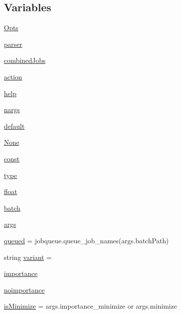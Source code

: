 \subsection*{Variables}
\begin{DoxyCompactItemize}
\item 
\mbox{\hyperlink{namespacerunbatch_a4f18cd32c846ab0a5e16c8faa1870f4d}{Opts}}
\item 
\mbox{\hyperlink{namespacerunbatch_a6677b19d3ca28718e0a595999b9f8508}{parser}}
\item 
\mbox{\hyperlink{namespacerunbatch_ad6bbef4ac29a023780e12007cf2eef6e}{combined\+Jobs}}
\item 
\mbox{\hyperlink{namespacerunbatch_a317dc1ef96a133f49e42244541d7a15d}{action}}
\item 
\mbox{\hyperlink{namespacerunbatch_a911bdd5e01476486a20d8bf9a3d6e8af}{help}}
\item 
\mbox{\hyperlink{namespacerunbatch_ac37494c96eb3c3d60df6e1a108e9f118}{nargs}}
\item 
\mbox{\hyperlink{namespacerunbatch_ad279156429242935671541523f463a72}{default}}
\item 
\mbox{\hyperlink{namespacerunbatch_a33ee289953dea56096e7160b0739a25a}{None}}
\item 
\mbox{\hyperlink{namespacerunbatch_a52875f52428216a8b8f2bcacbfc3763e}{const}}
\item 
\mbox{\hyperlink{namespacerunbatch_a880893c0c2ed2a29ef9b1ea030acbe53}{type}}
\item 
\mbox{\hyperlink{namespacerunbatch_a1b7ce1d9cae6c6ea080d681def1dd6e2}{float}}
\item 
\mbox{\hyperlink{namespacerunbatch_a61d01d0887dc9d18c4d043b0bfff42e0}{batch}}
\item 
\mbox{\hyperlink{namespacerunbatch_adec503d1c28d65e15089a63b97249a7d}{args}}
\item 
\mbox{\hyperlink{namespacerunbatch_af487521b97970b4098f133fb087fb1d8}{queued}} = jobqueue.\+queue\+\_\+job\+\_\+names(args.\+batch\+Path)
\item 
string \mbox{\hyperlink{namespacerunbatch_a662c65b4f24e2ee523551cc9a4d691cd}{variant}} = \textquotesingle{}\textquotesingle{}
\item 
\mbox{\hyperlink{namespacerunbatch_ad11fdd8a13bac84120b3525a10c533d7}{importance}}
\item 
\mbox{\hyperlink{namespacerunbatch_a9051982013a3015f278c22a95b6ae43a}{noimportance}}
\item 
\mbox{\hyperlink{namespacerunbatch_a0560065aead95ed3dc0f0e152240f0d3}{is\+Minimize}} = args.\+importance\+\_\+minimize or args.\+minimize

\end{DoxyCompactItemize}
